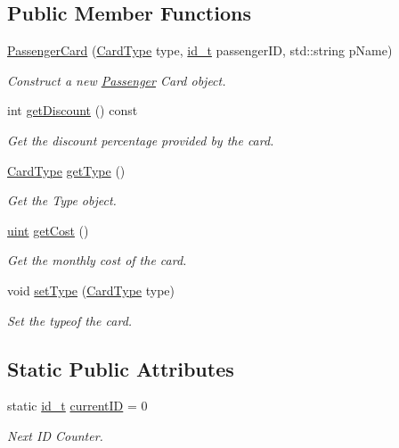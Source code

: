 \subsection*{Public Member Functions}
\begin{DoxyCompactItemize}
\item 
\mbox{\hyperlink{classPassengerCard_a1ebc730da7c0820350024f29c37ce9d9}{Passenger\+Card}} (\mbox{\hyperlink{classPassengerCard_ac30388c823af514403463a797e2878af}{Card\+Type}} type, \mbox{\hyperlink{project__utils_8h_a8f3a969054ad2200720b96e7e23dd4e1}{id\+\_\+t}} passenger\+ID, std\+::string p\+Name)
\begin{DoxyCompactList}\small\item\em Construct a new \mbox{\hyperlink{classPassenger}{Passenger}} Card object. \end{DoxyCompactList}\item 
int \mbox{\hyperlink{classPassengerCard_a62d2651d233d28643d5e0863500c42c4}{get\+Discount}} () const
\begin{DoxyCompactList}\small\item\em Get the discount percentage provided by the card. \end{DoxyCompactList}\item 
\mbox{\hyperlink{classPassengerCard_ac30388c823af514403463a797e2878af}{Card\+Type}} \mbox{\hyperlink{classPassengerCard_aef682e4bb625ac937c4aec7999c92626}{get\+Type}} ()
\begin{DoxyCompactList}\small\item\em Get the Type object. \end{DoxyCompactList}\item 
\mbox{\hyperlink{project__utils_8h_a91ad9478d81a7aaf2593e8d9c3d06a14}{uint}} \mbox{\hyperlink{classPassengerCard_a8428ca4fc3d4c7b4636be628c2fe5aad}{get\+Cost}} ()
\begin{DoxyCompactList}\small\item\em Get the monthly cost of the card. \end{DoxyCompactList}\item 
void \mbox{\hyperlink{classPassengerCard_ab0c4c67f185dc1abee907b6cd50413bf}{set\+Type}} (\mbox{\hyperlink{classPassengerCard_ac30388c823af514403463a797e2878af}{Card\+Type}} type)
\begin{DoxyCompactList}\small\item\em Set the typeof the card. \end{DoxyCompactList}\end{DoxyCompactItemize}
\subsection*{Static Public Attributes}
\begin{DoxyCompactItemize}
\item 
static \mbox{\hyperlink{project__utils_8h_a8f3a969054ad2200720b96e7e23dd4e1}{id\+\_\+t}} \mbox{\hyperlink{classPassengerCard_af557a01fde14b95c0e0b355e777e2aec}{current\+ID}} = 0
\begin{DoxyCompactList}\small\item\em Next ID Counter. \end{DoxyCompactList}\end{DoxyCompactItemize}


